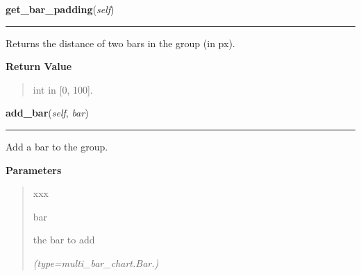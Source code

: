     \label{pygtk_chart:multi_bar_chart:BarGroup:get_bar_padding}

    \vspace{0.5ex}

\hspace{.8\funcindent}\begin{boxedminipage}{\funcwidth}

    \raggedright \textbf{get\_bar\_padding}(\textit{self})

    \vspace{-1.5ex}

    \rule{\textwidth}{0.5\fboxrule}
\setlength{\parskip}{2ex}
    Returns the distance of two bars in the group (in px).

\setlength{\parskip}{1ex}
      \textbf{Return Value}
    \vspace{-1ex}

      \begin{quote}
      int in [0, 100].

      \end{quote}

    \end{boxedminipage}

    \label{pygtk_chart:multi_bar_chart:BarGroup:add_bar}

    \vspace{0.5ex}

\hspace{.8\funcindent}\begin{boxedminipage}{\funcwidth}

    \raggedright \textbf{add\_bar}(\textit{self}, \textit{bar})

    \vspace{-1.5ex}

    \rule{\textwidth}{0.5\fboxrule}
\setlength{\parskip}{2ex}
    Add a bar to the group.

\setlength{\parskip}{1ex}
      \textbf{Parameters}
      \vspace{-1ex}

      \begin{quote}
        \begin{Ventry}{xxx}

          \item[bar]

          the bar to add

            {\it (type=multi\_bar\_chart.Bar.)}

        \end{Ventry}

      \end{quote}

    \end{boxedminipage}

